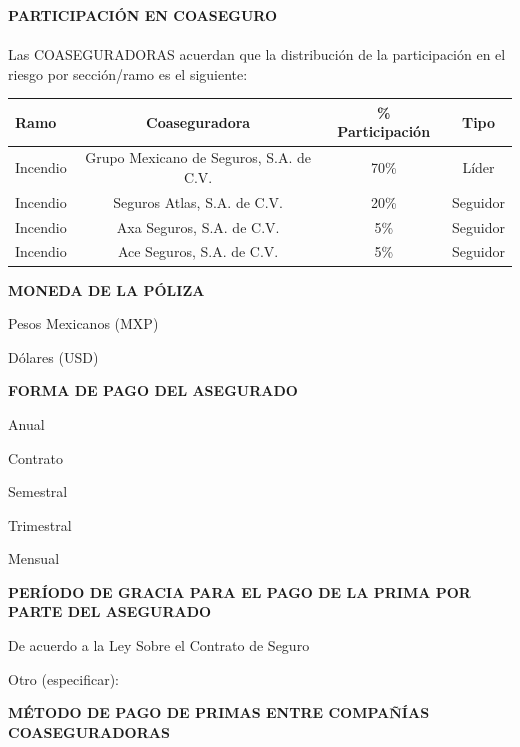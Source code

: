 \documentclass[letterpaper,10pt]{article}
\begin{document}
\textbf{PARTICIPACIÓN EN COASEGURO}\\\\
Las COASEGURADORAS acuerdan que la distribución de la participación en el riesgo por sección/ramo es el siguiente:

\begin{center}
    \begin{tabularx}{\textwidth}{|X|c|c|c|}
        \hline
        \textbf{Ramo} & \textbf{Coaseguradora} & \textbf{\% Participación} & \textbf{Tipo}\\\hline
        Incendio & Grupo Mexicano de Seguros, S.A. de C.V. & 70\% & Líder\\\hline
        Incendio & Seguros Atlas, S.A. de C.V. & 20\% & Seguidor\\\hline
        Incendio & Axa Seguros, S.A. de C.V. & 5\% & Seguidor\\\hline
        Incendio & Ace Seguros, S.A. de C.V. & 5\% & Seguidor\\
        \hline
    \end{tabularx}
\end{center}

\textbf{MONEDA DE LA PÓLIZA}

\begin{todolist}
    \item Pesos Mexicanos (MXP)
    \item Dólares (USD)
\end{todolist}

\textbf{FORMA DE PAGO DEL ASEGURADO}

\begin{todolist}
    \item Anual
    \item Contrato
    \item Semestral
    \item Trimestral
    \item Mensual
\end{todolist}

\textbf{PERÍODO DE GRACIA PARA EL PAGO DE LA PRIMA POR PARTE DEL ASEGURADO}

\begin{todolist}
    \item De acuerdo a la Ley Sobre el Contrato de Seguro
    \item Otro (especificar): \underline{\hspace{5cm}}
\end{todolist}
\newpage

\textbf{MÉTODO DE PAGO DE PRIMAS ENTRE COMPAÑÍAS COASEGURADORAS}
\end{document}
